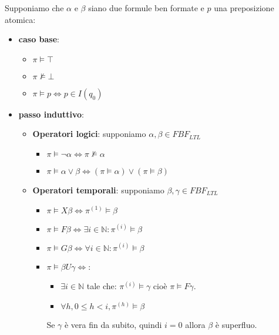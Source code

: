 \begin{definizione} [$\vDash$]
    Supponiamo che $\alpha$ e $\beta$ siano due formule ben formate e $p$ una
    preposizione atomica:
    \begin{itemize}
        \item \textbf{caso base}:
        \begin{itemize}
            \item $\pi \vDash \top$
            \item $\pi \not\vDash \bot$
            \item $\pi \vDash p \iff p\in I(q_0)$
        \end{itemize}
        \item \textbf{passo induttivo}:
        \begin{itemize}
            \item  \textbf{Operatori logici}: supponiamo $\alpha, \beta \in FBF_{LTL}$
                \begin{itemize}
                    \item $\pi \vDash \lnot \alpha \iff \pi \not\vDash \alpha$
                    \item $\pi \vDash \alpha \lor \beta \iff (\pi \vDash \alpha) \lor (\pi
                    \vDash \beta) $
                \end{itemize}
            \item \textbf{Operatori temporali}: supponiamo $\beta, \gamma \in FBF_{LTL}$
                  \begin{itemize}
                      \item $\pi \vDash X\beta \iff \pi^{(1)}\vDash \beta$
                      \item $\pi \vDash F \beta \iff \exists i \in \mathbb{N}:
                                \pi^{(i)} \vDash \beta$
                      \item $\pi \vDash G \beta \iff \forall i \in \mathbb{N}:
                                \pi^{(i)} \vDash \beta$
                      \item $\pi \vDash \beta U \gamma \iff$:
                            \begin{itemize}
                                \item $\exists i \in \mathbb{N}$ tale che: $\pi^{(i)}
                                          \vDash \gamma$ cioè $\pi \vDash F \gamma$.
                                \item $\forall h, 0 \leq h < i, \pi^{(h)} \vDash \beta$
                            \end{itemize}
                            Se $\gamma$ è vera fin da subito, quindi $i = 0$ allora
                            $\beta$ è superfluo.
                  \end{itemize}
        \end{itemize}
    \end{itemize}
\end{definizione}
